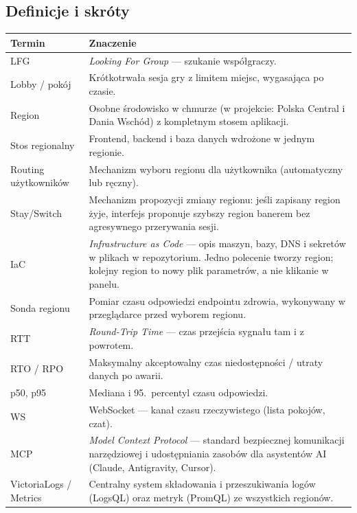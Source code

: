 \documentclass[12pt,a4paper]{article}
\begin{document}
\subsection{Definicje i skróty}
\begin{table}[H]
\centering\small
\begin{tabularx}{\textwidth}{@{}lY@{}}
\toprule
\textbf{Termin} & \textbf{Znaczenie} \\
\midrule
LFG & \emph{Looking For Group} --- szukanie współgraczy. \\
Lobby / pokój & Krótkotrwała sesja gry z limitem miejsc, wygasająca po czasie. \\
Region & Osobne środowisko w chmurze (w projekcie: Polska Central i Dania Wschód)  z kompletnym stosem aplikacji. \\
Stos regionalny & Frontend, backend i baza danych wdrożone w jednym regionie. \\
Routing użytkowników & Mechanizm wyboru regionu dla użytkownika (automatyczny lub ręczny). \\
Stay/Switch & Mechanizm propozycji zmiany regionu: jeśli zapisany region żyje, interfejs proponuje szybszy region banerem bez agresywnego przerywania sesji. \\
IaC & \emph{Infrastructure as Code} --- opis maszyn, bazy, DNS i sekretów w plikach w repozytorium. Jedno polecenie tworzy region; kolejny region to nowy plik parametrów, a nie klikanie w panelu. \\
Sonda regionu & Pomiar czasu odpowiedzi endpointu zdrowia, wykonywany w przeglądarce przed wyborem regionu. \\
RTT & \emph{Round-Trip Time} --- czas przejścia sygnału tam i z powrotem. \\
RTO / RPO & Maksymalny akceptowalny czas niedostępności / utraty danych po awarii. \\
p50, p95 & Mediana i 95.\ percentyl czasu odpowiedzi. \\
WS & WebSocket --- kanał czasu rzeczywistego (lista pokojów, czat). \\
MCP & \emph{Model Context Protocol} --- standard bezpiecznej komunikacji narzędziowej i udostępniania zasobów dla asystentów AI (Claude, Antigravity, Cursor). \\
VictoriaLogs / Metrics & Centralny system składowania i przeszukiwania logów (LogsQL) oraz metryk (PromQL) ze wszystkich regionów. \\
\bottomrule
\end{tabularx}
\end{table}
\end{document}
